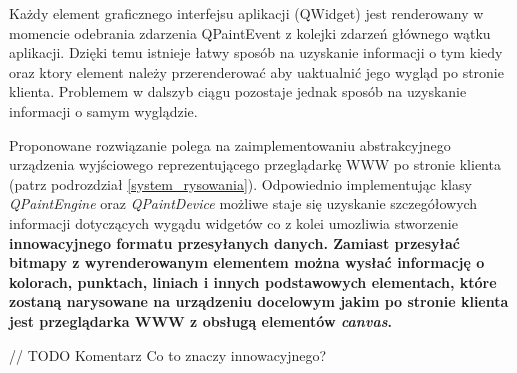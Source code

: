 Każdy element graficznego interfejsu aplikacji (QWidget) jest renderowany w momencie odebrania zdarzenia QPaintEvent z kolejki zdarzeń głównego wątku aplikacji. Dzięki temu istnieje łatwy sposób na uzyskanie informacji o tym kiedy oraz ktory element należy przerenderować aby uaktualnić jego wygląd po stronie klienta. Problemem w dalszyb ciągu pozostaje jednak sposób na uzyskanie informacji o samym wyglądzie. 

Proponowane rozwiązanie polega na zaimplementowaniu abstrakcyjnego urządzenia wyjściowego reprezentującego przeglądarkę WWW po stronie klienta (patrz podrozdział \ref{system_rysowania}). Odpowiednio implementując klasy \emph{QPaintEngine} oraz \emph{QPaintDevice} możliwe staje się uzyskanie szczegółowych informacji dotyczących wygądu widgetów co z kolei umozliwia stworzenie \bf{innowacyjnego} formatu przesyłanych danych. Zamiast przesyłać bitmapy z wyrenderowanym elementem można wysłać informację o kolorach, punktach, liniach i innych podstawowych elementach, które zostaną narysowane na urządzeniu docelowym jakim po stronie klienta jest przeglądarka WWW z obsługą elementów \emph{canvas}.


// TODO Komentarz Co to znaczy innowacyjnego?